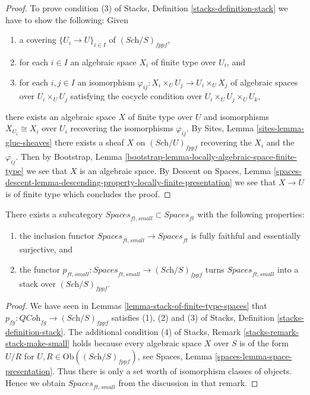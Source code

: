 \begin{proof}
\medskip\noindent
To prove condition (3) of
Stacks, Definition \ref{stacks-definition-stack}
we have to show the following: Given
\begin{enumerate}
\item a covering $\{U_i \to U\}_{i \in I}$ of $(\textit{Sch}/S)_{fppf}$,
\item for each $i \in I$ an algebraic space $X_i$ of finite type over $U_i$,
and
\item for each $i, j \in I$ an isomorphism
$\varphi_{ij} : X_i \times_U U_j \to U_i \times_U X_j$ of algebraic spaces
over $U_i \times_U U_j$ satisfying the cocycle condition over
$U_i \times_U U_j \times_U U_k$,
\end{enumerate}
there exists an algebraic space $X$ of finite type over $U$ and isomorphisms
$X_{U_i} \cong X_i$ over $U_i$ recovering the isomorphisms $\varphi_{ij}$. By
Sites, Lemma \ref{sites-lemma-glue-sheaves}
there exists a sheaf $X$ on $(\textit{Sch}/U)_{fppf}$ recovering
the $X_i$ and the $\varphi_{ij}$. Then by
Bootstrap, Lemma \ref{bootstrap-lemma-locally-algebraic-space-finite-type}
we see that $X$ is an algebraic space. By
Descent on Spaces, Lemma
\ref{spaces-descent-lemma-descending-property-locally-finite-presentation}
we see that $X \to U$ is of finite type which concludes the proof.
\end{proof}

\begin{lemma}
\label{lemma-stack-ft-spaces}
There exists a subcategory
$\textit{Spaces}_{ft, small} \subset \textit{Spaces}_{ft}$
with the following properties:
\begin{enumerate}
\item the inclusion functor
$\textit{Spaces}_{ft, small} \to \textit{Spaces}_{ft}$ is
fully faithful and essentially surjective, and
\item the functor
$p_{ft, small} : \textit{Spaces}_{ft, small} \to (\textit{Sch}/S)_{fppf}$
turns $\textit{Spaces}_{ft, small}$ into a stack over
$(\textit{Sch}/S)_{fppf}$.
\end{enumerate}
\end{lemma}

\begin{proof}
We have seen in
Lemmas \ref{lemma-stack-of-finite-type-spaces}
that $p_{fg} : \textit{QCoh}_{fg} \to (\textit{Sch}/S)_{fppf}$
satisfies (1), (2) and (3) of
Stacks, Definition \ref{stacks-definition-stack}.
The additional condition (4) of
Stacks, Remark \ref{stacks-remark-stack-make-small}
holds because every algebraic space $X$ over $S$ is of the
form $U/R$ for $U, R \in \text{Ob}((\textit{Sch}/S)_{fppf})$, see
Spaces, Lemma \ref{spaces-lemma-space-presentation}.
Thus there is only a set worth of isomorphism classes of objects.
Hence we obtain $\textit{Spaces}_{ft, small}$ from the discussion
in that remark.
\end{proof}

